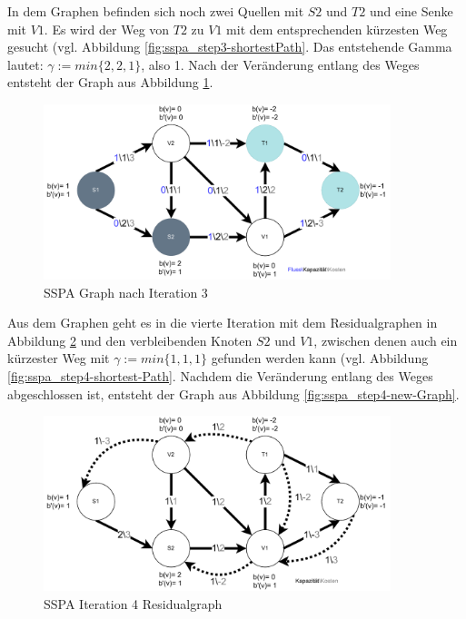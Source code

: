 In dem Graphen befinden sich noch zwei Quellen mit $S2$ und $T2$ und eine Senke mit $V1$. Es wird der Weg von $T2$ zu $V1$ mit dem entsprechenden kürzesten Weg gesucht (vgl. Abbildung \ref{fig:sspa_step3-shortestPath}. Das entstehende Gamma lautet: $\gamma := min\{2, 2, 1\}$, also 1. Nach der Veränderung entlang des Weges entsteht der Graph aus Abbildung \ref{fig:sspa_step3-new-Graph}.

\begin{figure}[H]
\centering
\includegraphics[width=0.9\textwidth]{img/anton/sspa-Step3-newGraph.pdf}
\caption{SSPA Graph nach Iteration 3}
\label{fig:sspa_step3-new-Graph}
\end{figure}

Aus dem Graphen geht es in die vierte Iteration mit dem Residualgraphen in Abbildung \ref{fig:sspa_step4-residual} und den verbleibenden Knoten $S2$ und $V1$, zwischen denen auch ein kürzester Weg mit $\gamma := min\{1, 1, 1\}$ gefunden werden kann (vgl. Abbildung \ref{fig:sspa_step4-shortest-Path}. Nachdem die Veränderung entlang des Weges abgeschlossen ist, entsteht der Graph aus Abbildung \ref{fig:sspa_step4-new-Graph}.

\begin{figure}[H]
\centering
\includegraphics[width=0.9\textwidth]{img/anton/sspa-Step4-residual.pdf}
\caption{SSPA Iteration 4 Residualgraph}
\label{fig:sspa_step4-residual}
\end{figure}

